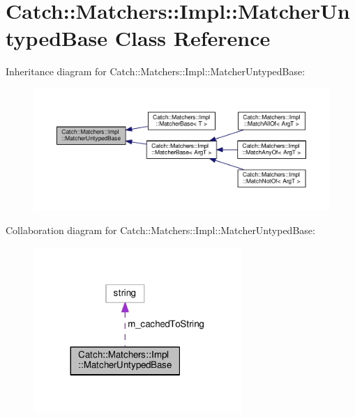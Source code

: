 \hypertarget{classCatch_1_1Matchers_1_1Impl_1_1MatcherUntypedBase}{}\section{Catch\+:\+:Matchers\+:\+:Impl\+:\+:Matcher\+Untyped\+Base Class Reference}
\label{classCatch_1_1Matchers_1_1Impl_1_1MatcherUntypedBase}


Inheritance diagram for Catch\+:\+:Matchers\+:\+:Impl\+:\+:Matcher\+Untyped\+Base\+:\nopagebreak
\begin{figure}[H]
\begin{center}
\leavevmode
\includegraphics[width=350pt]{classCatch_1_1Matchers_1_1Impl_1_1MatcherUntypedBase__inherit__graph}
\end{center}
\end{figure}


Collaboration diagram for Catch\+:\+:Matchers\+:\+:Impl\+:\+:Matcher\+Untyped\+Base\+:\nopagebreak
\begin{figure}[H]
\begin{center}
\leavevmode
\includegraphics[width=224pt]{classCatch_1_1Matchers_1_1Impl_1_1MatcherUntypedBase__coll__graph}
\end{center}
\end{figure}
